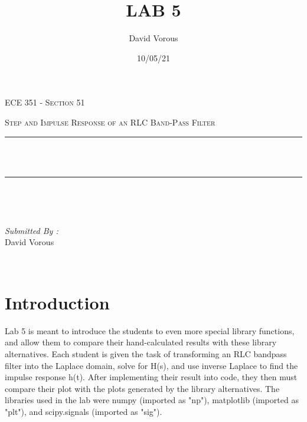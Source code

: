 \documentclass[12pt]{report}
\title{LAB 5}
\author{ David Vorous}
\date{10/05/21}
\makeatletter
\let\thetitle\@title
\makeatother
\begin{document}
\begin{titlepage}
	\centering
    \vspace*{0.5 cm}
\begin{center}    \textsc{\Large   ECE 351 - Section 51 }\\[2.0 cm]	\end{center}
	\textsc{\Large Step and Impulse Response of an RLC Band-Pass Filter  }\\[0.5 cm]
	\rule{\linewidth}{0.2 mm} \\[0.4 cm]
	{ \huge \bfseries \thetitle}\\
	\rule{\linewidth}{0.2 mm} \\[1.5 cm]
	
	\begin{minipage}{0.4\textwidth}
		\begin{flushleft} \large
			\end{flushleft}
			\end{minipage}~
			\begin{minipage}{0.4\textwidth}
            
			\begin{flushright} \large
			\emph{Submitted By :} \\
			David Vorous  
		\end{flushright}
           
	\end{minipage}\\[2 cm]

\end{titlepage}


\tableofcontents

\pagebreak

\renewcommand{\thesection}{\arabic{section}}

\section{Introduction}

	Lab 5 is meant to introduce the students to even more special library functions, and allow them to compare their hand-calculated results with these library alternatives. Each student is given the task of transforming an RLC bandpass filter into the Laplace domain, solve for H(s), and use inverse Laplace to find the impulse response h(t). After implementing their result into code, they then must compare their plot with the plots generated by the library alternatives. The libraries used in the lab were numpy (imported as "np"), matplotlib (imported as "plt"), and scipy.signals (imported as "sig").
\end{document}
